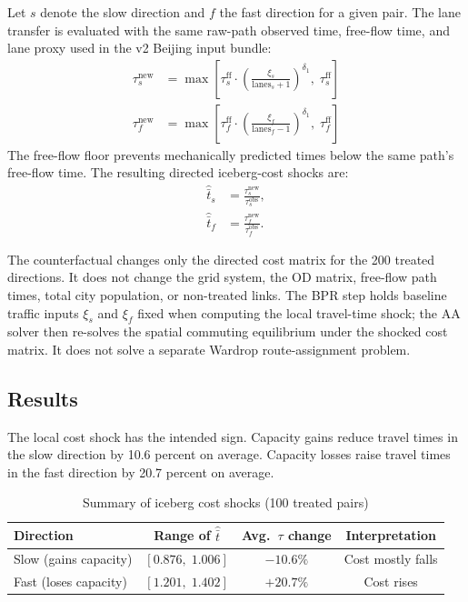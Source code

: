 \documentclass[12pt, a4paper]{article}
\begin{document}
Let $s$ denote the slow direction and $f$ the fast direction for a given pair.
The lane transfer is evaluated with the same raw-path observed time,
free-flow time, and lane proxy used in the v2 Beijing input bundle:
\begin{align}
  \tau_s^{\text{new}}
    &= \max\!\left[
        \tau_s^{\text{ff}} \cdot
        \left(\frac{\xi_s}{\text{lanes}_s + 1}\right)^{\!\delta_1},\;
        \tau_s^{\text{ff}}
      \right]
  \label{eq:tau_slow_new} \\[6pt]
  \tau_f^{\text{new}}
    &= \max\!\left[
        \tau_f^{\text{ff}} \cdot
        \left(\frac{\xi_f}{\text{lanes}_f - 1}\right)^{\!\delta_1},\;
        \tau_f^{\text{ff}}
      \right]
  \label{eq:tau_fast_new}
\end{align}
The free-flow floor prevents mechanically predicted times below the same
path's free-flow time.  The resulting directed iceberg-cost shocks are:
\begin{align}
  \hat{\bar{t}}_{s}
    &= \frac{\tau_s^{\text{new}}}{\tau_s^{\text{obs}}}, \\[4pt]
  \hat{\bar{t}}_{f}
    &= \frac{\tau_f^{\text{new}}}{\tau_f^{\text{obs}}}.
  \label{eq:tbarhat}
\end{align}

The counterfactual changes only the directed cost matrix for the 200 treated
directions.  It does not change the grid system, the OD matrix, free-flow
path times, total city population, or non-treated links.  The BPR step holds
baseline traffic inputs $\xi_s$ and $\xi_f$ fixed when computing the local
travel-time shock; the AA solver then re-solves the spatial commuting
equilibrium under the shocked cost matrix.  It does not solve a separate
Wardrop route-assignment problem.

\subsection{Results}

The local cost shock has the intended sign.  Capacity gains reduce travel
times in the slow direction by 10.6 percent on average.  Capacity losses
raise travel times in the fast direction by 20.7 percent on average.

\begin{table}[H]
\centering
\caption{Summary of iceberg cost shocks (100 treated pairs)}
\label{tab:tbar}
\begin{tabular}{lccc}
\toprule
Direction & Range of $\hat{\bar{t}}$ & Avg.\ $\tau$ change & Interpretation \\
\midrule
Slow (gains capacity) & $[0.876,\; 1.006]$ & $-10.6\%$ & Cost mostly falls \\
Fast (loses capacity) & $[1.201,\; 1.402]$ & $+20.7\%$ & Cost rises \\
\bottomrule
\end{tabular}
\end{table}
\end{document}
